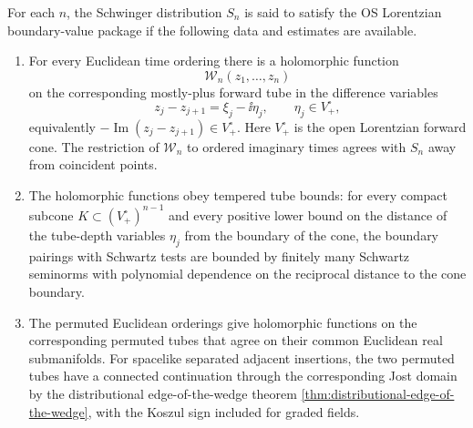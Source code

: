 \begin{definition}
\label{def:os-lorentzian-boundary-value-package}
For each \(n\), the Schwinger distribution \(S_n\) is said to satisfy the OS
Lorentzian boundary-value package if the following data and estimates are
available.

\begin{enumerate}[label=(\roman*)]
\item For every Euclidean time ordering there is a holomorphic function
\[
  \mathcal W_n(z_1,\ldots,z_n)
\]
on the corresponding mostly-plus forward tube in the difference variables
\[
  z_j-z_{j+1}=\xi_j-\ii\eta_j,
  \qquad \eta_j\in V_+^\circ ,
\]
equivalently \(-\operatorname{Im}(z_j-z_{j+1})\in V_+^\circ\).  Here
\(V_+^\circ\) is the open Lorentzian forward cone.  The restriction of
\(\mathcal W_n\) to ordered imaginary times agrees with \(S_n\) away from
coincident points.
\item The holomorphic functions obey tempered tube bounds: for every compact
subcone \(K\subset (V_+^\circ)^{n-1}\) and every positive lower bound on the
distance of the tube-depth variables \(\eta_j\) from the boundary of the
cone, the boundary pairings with Schwartz tests are bounded by finitely many
Schwartz seminorms with polynomial dependence on the reciprocal distance to
the cone boundary.
\item The permuted Euclidean orderings give holomorphic functions on the
corresponding permuted tubes that agree on their common Euclidean real
submanifolds.  For spacelike separated adjacent insertions, the two
permuted tubes have a connected continuation through the corresponding Jost
domain by the distributional edge-of-the-wedge theorem
\ref{thm:distributional-edge-of-the-wedge}, with the Koszul sign included
for graded fields.
\end{enumerate}
\end{definition}

